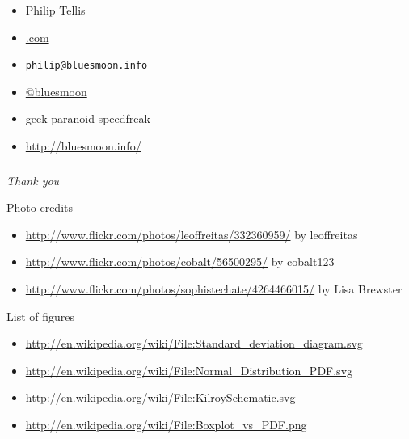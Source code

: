 \documentclass{beamer}
\newcommand{\innersplash}[1]{
  \begin{center}
    \Large \textrm{\textit{ #1 } }
  \end{center}
}
\newcommand{\splashslide}[2][{}]{
  \begin{frame}
  \frametitle{#1}
  \innersplash{#2}
  \end{frame}
}
\begin{document}
\begin{frame}
  \begin{itemize}
  \item Philip Tellis
  \item \href{http://www.lognormal.com/}{\textrm{\textcolor{med-gray}{.com}}}
  \item \small{\texttt{philip@bluesmoon.info}}
  \item \href{http://twitter.com/bluesmoon}{@bluesmoon}
  \item geek paranoid speedfreak
  \item \href{http://bluesmoon.info/}{http://bluesmoon.info/}
  \end{itemize}
\end{frame}

\splashslide{\Huge Thank you }

\begin{frame}{Photo credits}
  \small{
  \begin{itemize}
  \item \href{http://www.flickr.com/photos/leoffreitas/332360959/}{http://www.flickr.com/photos/leoffreitas/332360959/} by leoffreitas
  \item \href{http://www.flickr.com/photos/cobalt/56500295/}{http://www.flickr.com/photos/cobalt/56500295/} by cobalt123
  \item \href{http://www.flickr.com/photos/sophistechate/4264466015/}{http://www.flickr.com/photos/sophistechate/4264466015/} by Lisa Brewster
  \end{itemize}
  }
\end{frame}

\begin{frame}{List of figures}
  \small{
  \begin{itemize}
  \item \href{http://en.wikipedia.org/wiki/File:Standard_deviation_diagram.svg}{http://en.wikipedia.org/wiki/File:Standard\_deviation\_diagram.svg}
  \item \href{http://en.wikipedia.org/wiki/File:Normal_Distribution_PDF.svg}{http://en.wikipedia.org/wiki/File:Normal\_Distribution\_PDF.svg}
  \item \href{http://en.wikipedia.org/wiki/File:KilroySchematic.svg}{http://en.wikipedia.org/wiki/File:KilroySchematic.svg}
  \item \href{http://en.wikipedia.org/wiki/File:Boxplot_vs_PDF.png}{http://en.wikipedia.org/wiki/File:Boxplot\_vs\_PDF.png}
  \end{itemize}
  }
\end{frame}
\end{document}
